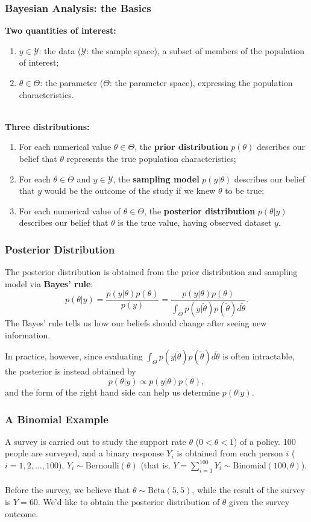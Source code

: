 \documentclass{beamer}
\begin{document}
\begin{frame}
\frametitle{Bayesian Analysis: the Basics}
\textbf{Two quantities of interest:}
\begin{enumerate}
\item $y \in \mathcal{Y}$: the data ($\mathcal{Y}$: the sample space), a subset of members of the population of interest;
\item $\theta \in \Theta$: the parameter ($\Theta$: the parameter space), expressing the population characteristics.
\end{enumerate}
~\\
\textbf{Three distributions:}
\begin{enumerate}
\item For each numerical value $\theta \in \Theta$, the \textbf{prior distribution} $p(\theta)$ describes our belief that $\theta$ represents the true population characteristics;
\item For each $\theta \in \Theta$ and $y \in \mathcal{Y}$, the \textbf{sampling model} $p(y|\theta)$ describes our belief that $y$ would be the outcome of the study if we knew $\theta$ to be true;
\item For each numerical value of $\theta \in \Theta$, the \textbf{posterior distribution} $p(\theta|y)$ describes our belief that $\theta$ is the true value, having observed dataset $y$.
\end{enumerate}
\end{frame}

\begin{frame}
\frametitle{Posterior Distribution}
The posterior distribution is obtained from the prior distribution and sampling model via \textbf{Bayes' rule}:
$$
p(\theta|y) = \frac{p(y|\theta)p(\theta)}{p(y)} = \frac{p(y|\theta)p(\theta)}{\int_{\Theta}p(y|\tilde{\theta})p(\tilde{\theta})d\tilde{\theta}}.
$$
The Bayes' rule tells us how our beliefs should change after seeing new information.

In practice, however, since evaluating $\int_{\Theta}p(y|\tilde{\theta})p(\tilde{\theta})d\tilde{\theta}$ is often intractable, the posterior is instead obtained by
$$
p(\theta|y) \propto p(y|\theta)p(\theta),
$$
and the form of the right hand side can help us determine $p(\theta|y)$.
\end{frame}

\begin{frame}
\frametitle{A Binomial Example}
A survey is carried out to study the support rate $\theta$ ($0 < \theta < 1$) of a policy. 100 people are surveyed, and a binary response $Y_i$ is obtained from each person $i$ ($i=1,2,\ldots,100$), $Y_i \sim \text{Bernoulli}(\theta)$ (that is, $Y = \sum_{i=1}^{100}Y_i \sim \text{Binomial}(100,\theta)$). 
\\~\\
Before the survey, we believe that $\theta \sim \text{Beta}(5,5)$, while the result of the survey is $Y=60$. We'd like to obtain the posterior distribution of $\theta$ given the survey outcome.
\end{frame}
\end{document}
